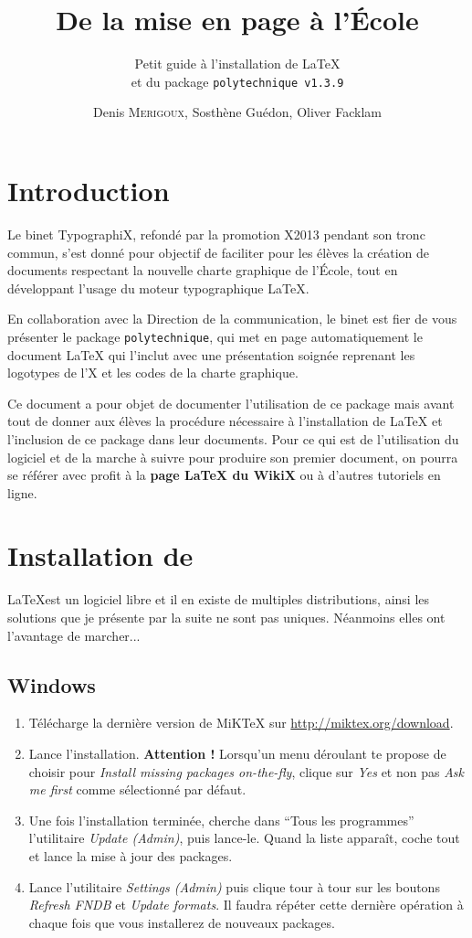 \documentclass[a4paper,12pt,twoside]{article}
\title{De la mise en page à l'École}
\subtitle{Petit guide à l'installation de \textrm{\LaTeX}\\et du package \textup{\texttt{polytechnique v1.3.9}}}
\author{Denis \textsc{Merigoux}, Sosthène Guédon, Oliver Facklam}
\begin{document}
\maketitle

\section{Introduction}

Le binet TypographiX, refondé par la promotion X2013 pendant son tronc commun, s'est donné pour objectif de faciliter pour les élèves la création de documents respectant la nouvelle charte graphique de l'École, tout en développant l'usage du moteur typographique \LaTeX.

En collaboration avec la Direction de la communication, le binet est fier de vous présenter le package \texttt{polytechnique}, qui met en page automatiquement le document \LaTeX{} qui l'inclut avec une présentation soignée reprenant les logotypes de l'X et les codes de la charte graphique.

Ce document a pour objet de documenter l'utilisation de ce package mais avant tout de donner aux élèves la procédure nécessaire à l'installation de \LaTeX{} et l'inclusion de ce package dans leur documents. Pour ce qui est de l'utilisation du logiciel et de la marche à suivre pour produire son premier document, on pourra se référer avec profit à la \textbf{page LaTeX du WikiX} ou à d'autres tutoriels en ligne.

\section{Installation de \rmfamily{\LaTeX}}

\LaTeX est un logiciel libre et il en existe de multiples distributions, ainsi les solutions que je présente par la suite ne sont pas uniques. Néanmoins elles ont l'avantage de marcher...

\subsection{Windows}

\begin{enumerate}
	\item Télécharge la dernière version de MiKTeX sur \url{http://miktex.org/download}.
	\item Lance l'installation. \textbf{Attention !} Lorsqu'un menu déroulant te propose de choisir pour \emph{Install missing packages on-the-fly}, clique sur \emph{Yes} et non pas \emph{Ask me first} comme sélectionné par défaut.
	\item Une fois l'installation terminée, cherche dans \enquote{Tous les programmes} l'utilitaire \emph{Update (Admin)}, puis lance-le. Quand la liste apparaît, coche tout et lance la mise à jour des packages.
	\item Lance l'utilitaire \emph{Settings (Admin)} puis clique tour à tour sur les boutons \emph{Refresh FNDB} et \emph{Update formats}. Il faudra répéter cette dernière opération à chaque fois que vous installerez de nouveaux packages.
\end{enumerate}
\end{document}
